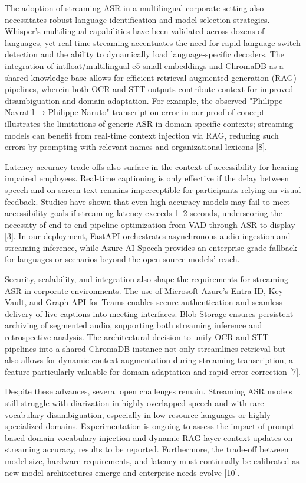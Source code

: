 \documentclass[12pt,a4paper]{article}
\begin{document}
The adoption of streaming ASR in a multilingual corporate setting also necessitates robust language identification and model selection strategies. Whisper’s multilingual capabilities have been validated across dozens of languages, yet real-time streaming accentuates the need for rapid language-switch detection and the ability to dynamically load language-specific decoders. The integration of intfloat/multilingual-e5-small embeddings and ChromaDB as a shared knowledge base allows for efficient retrieval-augmented generation (RAG) pipelines, wherein both OCR and STT outputs contribute context for improved disambiguation and domain adaptation. For example, the observed "Philippe Navratil → Philippe Naruto" transcription error in our proof-of-concept illustrates the limitations of generic ASR in domain-specific contexts; streaming models can benefit from real-time context injection via RAG, reducing such errors by prompting with relevant names and organizational lexicons [8].


Latency-accuracy trade-offs also surface in the context of accessibility for hearing-impaired employees. Real-time captioning is only effective if the delay between speech and on-screen text remains imperceptible for participants relying on visual feedback. Studies have shown that even high-accuracy models may fail to meet accessibility goals if streaming latency exceeds 1–2 seconds, underscoring the necessity of end-to-end pipeline optimization from VAD through ASR to display [3]. In our deployment, FastAPI orchestrates asynchronous audio ingestion and streaming inference, while Azure AI Speech provides an enterprise-grade fallback for languages or scenarios beyond the open-source models’ reach.


Security, scalability, and integration also shape the requirements for streaming ASR in corporate environments. The use of Microsoft Azure’s Entra ID, Key Vault, and Graph API for Teams enables secure authentication and seamless delivery of live captions into meeting interfaces. Blob Storage ensures persistent archiving of segmented audio, supporting both streaming inference and retrospective analysis. The architectural decision to unify OCR and STT pipelines into a shared ChromaDB instance not only streamlines retrieval but also allows for dynamic context augmentation during streaming transcription, a feature particularly valuable for domain adaptation and rapid error correction [7].


Despite these advances, several open challenges remain. Streaming ASR models still struggle with diarization in highly overlapped speech and with rare vocabulary disambiguation, especially in low-resource languages or highly specialized domains. Experimentation is ongoing to assess the impact of prompt-based domain vocabulary injection and dynamic RAG layer context updates on streaming accuracy, results to be reported. Furthermore, the trade-off between model size, hardware requirements, and latency must continually be calibrated as new model architectures emerge and enterprise needs evolve [10].
\end{document}

